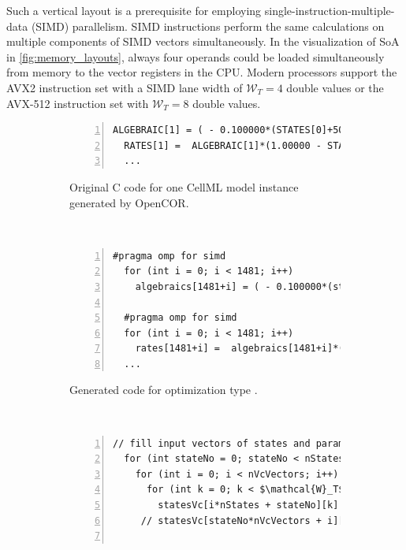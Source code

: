 Such a vertical layout is a prerequisite for employing single-instruction-multiple-data (SIMD) parallelism. SIMD instructions perform the same calculations on multiple components of SIMD vectors simultaneously. In the visualization of SoA in \cref{fig:memory_layouts}, always four operands could be loaded simultaneously from memory to the vector registers in the CPU. Modern processors support the AVX2 instruction set with a SIMD lane width of $\mathcal{W}_T=4$ double values or the AVX-512 instruction set with $\mathcal{W}_T=8$ double values.

\begin{figure}
\centering
  \begin{subfigure}[t]{\textwidth}%
  \centering%
\begin{framed}
\begin{lstlisting}[basicstyle=\footnotesize\ttfamily,commentstyle=\color{gray},numbers=left]
  ALGEBRAIC[1] = ( - 0.100000*(STATES[0]+50.0000))/(exp(- (STATES[0]+50.0000)/10.0
  RATES[1] =  ALGEBRAIC[1]*(1.00000 - STATES[1]) -  ALGEBRAIC[5]*STATES[1];
  ...
\end{lstlisting}
\end{framed}
    \caption{Original C code for one CellML model instance generated by OpenCOR.}%
    \label{fig:cellml_codes_original}%
  \end{subfigure}\\[4mm]
  \begin{subfigure}[t]{\textwidth}%
  \centering%
\begin{framed}
\begin{lstlisting}[basicstyle=\footnotesize\ttfamily,commentstyle=\color{gray},numbers=left]
  #pragma omp for simd
  for (int i = 0; i < 1481; i++)
    algebraics[1481+i] = ( - 0.100000*(states[0+i]+50.0000))/(exp(- (states[0+i]+5
    
  #pragma omp for simd
  for (int i = 0; i < 1481; i++)
    rates[1481+i] =  algebraics[1481+i]*(1.00000 - states[1481+i]) -  algebraics[7
  ...
\end{lstlisting}
\end{framed}
    \caption{Generated code for optimization type .}%
    \label{fig:cellml_codes_simd}%
  \end{subfigure}\\[4mm]
  \begin{subfigure}[t]{\textwidth}%
  \centering%
\begin{framed}
\begin{lstlisting}[basicstyle=\footnotesize\ttfamily,commentstyle=\color{gray},numbers=left]
  // fill input vectors of states and parameters
  for (int stateNo = 0; stateNo < nStates; stateNo++)
    for (int i = 0; i < nVcVectors; i++)  // Vc vector no
      for (int k = 0; k < $\mathcal{W}_T$; k++)  // entry no in Vc vector 
        statesVc[i*nStates + stateNo][k] = states[stateNo*nInstances + i*$\mathcal{W}_T$+k]; $\label{alg:st_aovs}$
     // statesVc[stateNo*nVcVectors + i][k] = states[stateNo*nInstances + i*$\textcolor{gray}{\mathcal{W}_T}$+k]  $\label{alg:st_sova}$


\end{lstlisting}
\end{framed}
\end{subfigure}
\end{figure}
